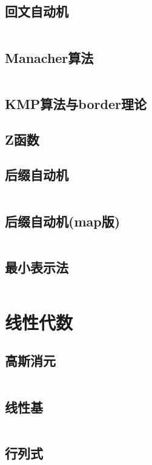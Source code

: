 \documentclass[10pt, a4paper, oneside]{ctexart}
\begin{document}
\begin{multicols}{2}
        \subsection{回文自动机}
        \inputminted{cpp}{src/string/PAM.cpp}
        \subsection{Manacher算法}
        \inputminted{cpp}{src/string/manacher.cpp}
        \subsection{KMP算法与border理论}
        
        \subsection{Z函数}
        
        \subsection{后缀自动机}
        \inputminted{cpp}{src/string/SAM.cpp}
        \subsection{后缀自动机(map版)}
        \inputminted[highlightlines={3,10,15,18}]{cpp}{src/string/SAM_map.cpp}
        \subsection{最小表示法}
        \inputminted{cpp}{src/string/min_pos.cpp}
        \newpage

        \section{线性代数}
        \subsection{高斯消元}
        \inputminted{cpp}{src/linear/gauss.cpp}
        \subsection{线性基}
        \inputminted{cpp}{src/linear/basis.cpp}
        \subsection{行列式}
        

\end{multicols}
\end{document}
